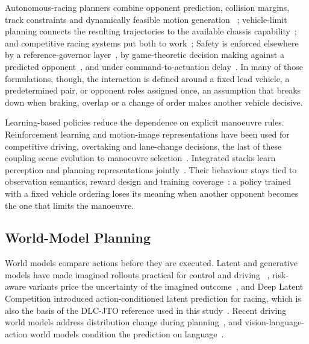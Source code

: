 \documentclass[journal]{IEEEtran}
\begin{document}
Autonomous-racing planners combine opponent prediction, collision margins,
track constraints and dynamically feasible motion generation
~\cite{raji2022multivehicle,wischnewski2023tube}; vehicle-limit planning
connects the resulting trajectories to the available chassis
capability~\cite{cheng2024chassis_trajectory,cheng2025hybrid_dynamic}; and
competitive racing systems put both to
work~\cite{betz2023tum,jung2023kaist,steiner2025f1tenth_overtaking,hoffmann2026a2rl};
Safety is enforced elsewhere by a reference-governor
layer~\cite{li2025refgov}, by game-theoretic decision making against a predicted
opponent~\cite{cai2024gametheoretic}, and under command-to-actuation
delay~\cite{kalaria2024delay}. In many of those formulations, though, the
interaction is defined around a fixed
lead vehicle, a predetermined pair, or opponent roles assigned once, an
assumption that breaks down when braking, overlap or a change of order makes
another vehicle decisive.

Learning-based policies reduce the dependence on explicit manoeuvre rules.
Reinforcement learning and motion-image representations have been used for
competitive driving, overtaking and lane-change decisions, the last of these
coupling scene evolution to manoeuvre
selection~\cite{wurman2022granturismo,cheng2023cnn_lanechange,lodhi2025option}.
Integrated stacks learn perception and planning representations
jointly~\cite{chitta2023transfuser,chen2023interfuser,hu2023uniad}. Their
behaviour stays tied to observation semantics, reward design and training
coverage~\cite{kiran2021drlsurvey,yurtsever2020survey}: a policy trained with a
fixed vehicle ordering loses its meaning when another opponent becomes the one
that limits the manoeuvre.

\subsection{World-Model Planning}

World models compare actions before they are executed. Latent and generative
models have made imagined rollouts practical for control and driving
~\cite{hafner2023dreamerv3,hu2022mile,hu2023gaia}, risk-aware variants price the
uncertainty of the imagined outcome~\cite{hu2025riskaware}, and Deep Latent Competition
introduced action-conditioned latent prediction for racing, which is also the
basis of the DLC-JTO reference used in this study~\cite{schwarting2021dlc}.
Recent driving world models address distribution change during
planning~\cite{tu2025dwm_survey,wang2025adawm,yang2026worldrft}, and
vision-language-action world models condition the prediction on
language~\cite{wang2026vlaworld}.
\end{document}
